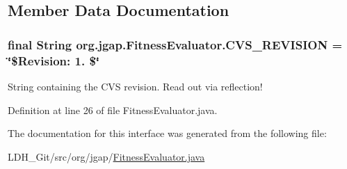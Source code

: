 \subsection{Member Data Documentation}
\hypertarget{interfaceorg_1_1jgap_1_1_fitness_evaluator_a32a4b647d27c9df5261b4efb0e7a8452}{
\subsubsection[{C\-V\-S\-\_\-\-R\-E\-V\-I\-S\-I\-O\-N}]{\setlength{\rightskip}{0pt plus 5cm}final String org.\-jgap.\-Fitness\-Evaluator.\-C\-V\-S\-\_\-\-R\-E\-V\-I\-S\-I\-O\-N = \char`\"{}\$Revision\-: 1. \$\char`\"{}\hspace{0.3cm}{\ttfamily [static]}}}\label{interfaceorg_1_1jgap_1_1_fitness_evaluator_a32a4b647d27c9df5261b4efb0e7a8452}
String containing the C\-V\-S revision. Read out via reflection! 

Definition at line 26 of file Fitness\-Evaluator.\-java.



The documentation for this interface was generated from the following file\-:\begin{DoxyCompactItemize}
\item 
L\-D\-H\-\_\-\-Git/src/org/jgap/\hyperlink{_fitness_evaluator_8java}{Fitness\-Evaluator.\-java}\end{DoxyCompactItemize}
